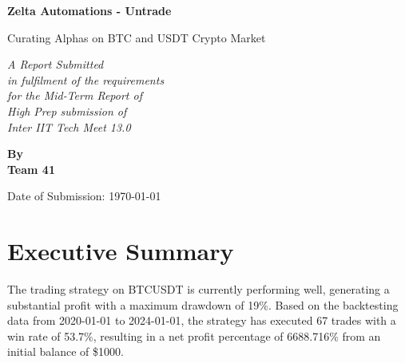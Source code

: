 \documentclass[12pt]{article}
\begin{document}
\begin{titlepage}
    \centering
    \vspace*{2cm}
    
    \Huge
    \textbf{Zelta Automations - Untrade}
    
    \vspace{0.5cm}
    \LARGE
    Curating Alphas on BTC and USDT Crypto Market
    
    \vspace{2cm}
    
{\fontsize{14}{18}\selectfont\textit{A Report Submitted\\
    in fulfilment of the requirements\\
    for the Mid-Term Report of\\
    High Prep submission of\\
    Inter IIT Tech Meet 13.0}}
    
    \vspace{2cm}
    
    \Large
    \textbf{By\\
    Team 41}
    
    \vfill
    
    \Large
    Date of Submission: \today
    
\end{titlepage}

\newpage
\tableofcontents

\section{Executive Summary}
The trading strategy on BTCUSDT is currently performing well, generating a substantial profit with a maximum drawdown of 19\%. Based on the backtesting data from 2020-01-01 to 2024-01-01, the strategy has executed 67 trades with a win rate of 53.7\%, resulting in a net profit percentage of 6688.716\% from an initial balance of \$1000.
\end{document}
